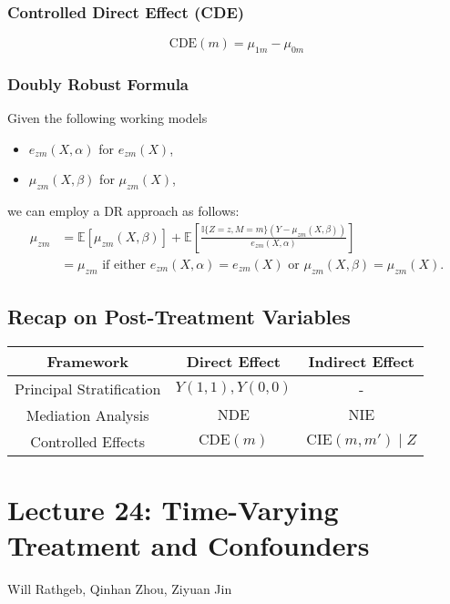 \subsubsection*{Controlled Direct Effect (CDE)}
\[
\text{CDE}(m) = \mu_{1m} - \mu_{0m}
\]

\subsubsection*{Doubly Robust Formula}
Given the following working models
\begin{itemize}
    \item $e_{zm}(X, \alpha)$ for $e_{zm}(X)$,
    \item $\mu_{zm}(X, \beta)$ for $\mu_{zm}(X)$,
\end{itemize}
we can employ a DR approach as follows:
\begin{align*}
    \mu_{zm} &= \mathbb{E} \left[\mu_{zm}(X, \beta)\right] + \mathbb{E} \left[\frac{\mathbb{I}\{Z = z, M = m\} (Y - \mu_{zm}(X, \beta))}{e_{zm}(X, \alpha)} \right] \\
    &= \mu_{zm} \text{ if either } e_{zm}(X, \alpha) = e_{zm}(X) \text{ or } \mu_{zm}(X, \beta) = \mu_{zm}(X).
\end{align*}
\subsection*{Recap on Post-Treatment Variables}
\begin{tabular}{|c|c|c|}
    \hline
    Framework & Direct Effect & Indirect Effect \\ \hline
    Principal Stratification & $Y(1,1), Y(0,0)$ & - \\ \hline
    Mediation Analysis & $\text{NDE}$ & $\text{NIE}$ \\ \hline
    Controlled Effects & $\text{CDE}(m)$ & $\text{CIE}(m, m') \mid Z$ \\ \hline
\end{tabular}

\section{Lecture 24: Time-Varying Treatment and Confounders}{Will Rathgeb, Qinhan Zhou, Ziyuan Jin}

